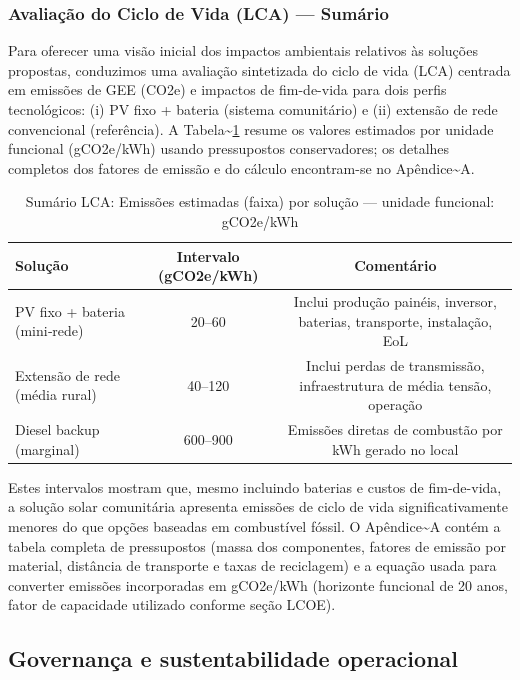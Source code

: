 \documentclass[12pt, a4paper]{article}
\begin{document}
\subsubsection{Avaliação do Ciclo de Vida (LCA) — Sumário}

Para oferecer uma visão inicial dos impactos ambientais relativos às soluções propostas, conduzimos
uma avaliação sintetizada do ciclo de vida (LCA) centrada em emissões de GEE (CO2e) e
impactos de fim-de-vida para dois perfis tecnológicos: (i) PV fixo + bateria (sistema comunitário)
e (ii) extensão de rede convencional (referência). A Tabela\textasciitilde{}\ref{tab:lca_summary} resume os
valores estimados por unidade funcional (gCO2e/kWh) usando pressupostos conservadores; os
detalhes completos dos fatores de emissão e do cálculo encontram-se no Apêndice\textasciitilde{}A.

\begin{table}[H]
\centering
\caption{Sumário LCA: Emissões estimadas (faixa) por solução — unidade funcional: gCO2e/kWh}
\label{tab:lca_summary}

\small
\begin{tabular}{lcc}
\toprule
\rowcolor{LightBlue}\textbf{Solução} & \textbf{Intervalo (gCO2e/kWh)} & \textbf{Comentário} \\
\midrule
PV fixo + bateria (mini‑rede) & 20--60 & Inclui produção painéis, inversor, baterias, transporte, instalação, EoL \\
Extensão de rede (média rural) & 40--120 & Inclui perdas de transmissão, infraestrutura de média tensão, operação \\
Diesel backup (marginal) & 600--900 & Emissões diretas de combustão por kWh gerado no local \\
\bottomrule
\end{tabular}
\end{table}

Estes intervalos mostram que, mesmo incluindo baterias e custos de fim-de-vida, a solução
solar comunitária apresenta emissões de ciclo de vida significativamente menores do que
opções baseadas em combustível fóssil. O Apêndice\textasciitilde{}A contém a tabela completa de pressupostos
(massa dos componentes, fatores de emissão por material, distância de transporte e taxas de
reciclagem) e a equação usada para converter emissões incorporadas em gCO2e/kWh (horizonte
funcional de 20 anos, fator de capacidade utilizado conforme seção LCOE).


\subsection{Governança e sustentabilidade operacional}
\end{document}
